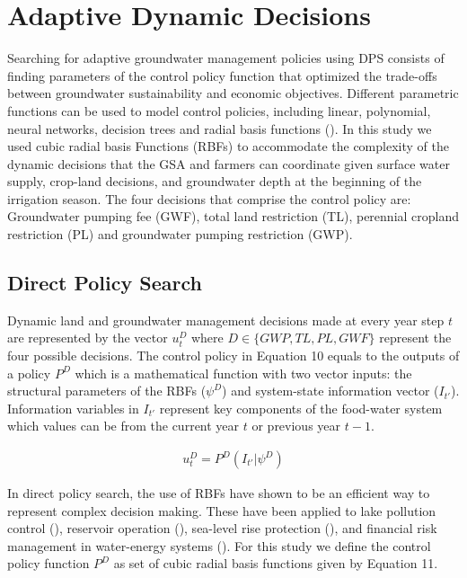 \documentclass[11pt,a4paper]{article}
\begin{document}
\section{Adaptive Dynamic Decisions}

Searching for adaptive groundwater management policies using DPS consists of finding parameters of the control policy function that optimized the trade-offs between groundwater sustainability and economic objectives. Different parametric functions can be used to model control policies, including linear, polynomial, neural networks, decision trees and radial basis functions (\cite{giuliani_universal_2014}). In this study we used cubic radial basis Functions (RBFs) to accommodate the complexity of the dynamic decisions that the GSA and farmers can coordinate given surface water supply, crop-land decisions, and groundwater depth at the beginning of the irrigation season. The four decisions that comprise the control policy are: Groundwater pumping fee (GWF), total land restriction (TL), perennial cropland restriction (PL) and groundwater pumping restriction (GWP). 


\subsection{Direct Policy Search}

Dynamic land and groundwater management decisions made at every year step $t$ are represented by the vector $u_{t}^D$ where $D \in \{GWP,TL,PL,GWF\}$ represent the four possible decisions. The control policy in Equation 10 equals to the outputs of a policy $P^D$ which is a mathematical function with two vector inputs: the structural parameters of the RBFs ($\psi^D$) and system-state information vector ($I_{t'}$). Information variables in $I_{t'}$ represent key components of the food-water system which values can be from the current year $t$ or previous year $t-1$. 

\begin{align}
u_{t}^D = P^{D}(I_{t'}|\psi^{D})
\end{align}

In direct policy search, the use of RBFs have shown to be an efficient way to represent complex decision making. These have been applied to lake pollution control (\cite{quinn_direct_2017}), reservoir operation (\cite{giuliani_universal_2014, zatarain_salazar_balancing_2017}), sea-level rise protection (\cite{garner_using_2018}), and financial risk management in water-energy systems (\cite{gupta_can_2020,hamilton_stream_2022}). For this study we define the control policy function $P^D$ as set of cubic radial basis functions given by Equation 11.
\end{document}
